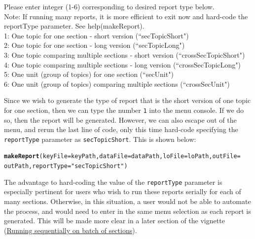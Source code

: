 \documentclass{article}\usepackage[]{graphicx}\usepackage[]{color}
\makeatletter
\newcommand{\hlstr}[1]{\textcolor[rgb]{0.192,0.494,0.8}{#1}}%
\newcommand{\hlstd}[1]{\textcolor[rgb]{0.345,0.345,0.345}{#1}}%
\newcommand{\hlkwc}[1]{\textcolor[rgb]{0.333,0.667,0.333}{#1}}%
\newcommand{\hlkwd}[1]{\textcolor[rgb]{0.737,0.353,0.396}{\textbf{#1}}}%
\newenvironment{kframe}{%
 \def\at@end@of@kframe{}%
 \ifinner\ifhmode%
  \def\at@end@of@kframe{\end{minipage}}%
  \begin{minipage}{\columnwidth}%
 \fi\fi%
 \def\FrameCommand##1{\hskip\@totalleftmargin \hskip-\fboxsep
 \colorbox{shadecolor}{##1}\hskip-\fboxsep
     \hskip-\linewidth \hskip-\@totalleftmargin \hskip\columnwidth}%
 \MakeFramed {\advance\hsize-\width
   \@totalleftmargin\z@ \linewidth\hsize
   \@setminipage}}%
 {\par\unskip\endMakeFramed%
 \at@end@of@kframe}
\newenvironment{knitrout}{}{} %
\numberwithin{equation}{section} %
\makeatother
\begin{document}
\begin{framed}
\vspace{2mm}
Please enter integer (1-6) corresponding to desired report type below.\\

Note: If running many reports, it is more efficient to exit now and hard-code the reportType parameter. See help(makeReport).\\

1: One topic for one section - short version (``secTopicShort")\\
2: One topic for one section - long version (``secTopicLong")\\
3: One topic comparing multiple sections - short version (``crossSecTopicShort")\\
4: One topic comparing multiple sections - long version (``crossSecTopicLong")\\
5: One unit (group of topics) for one section (``secUnit")\\
6: One unit (group of topics) comparing multiple sections (``crossSecUnit")\\
\end{framed}

Since we wish to generate the type of report that is the short version of one topic for one section, then we can type the number \texttt{1} into the menu console. If we do so, then the report will be generated. However, we can also escape out of the menu, and rerun the last line of code, only this time hard-code specifying the \texttt{reportType} parameter as \texttt{secTopicShort}. This is shown below:

\begin{knitrout}
\color{fgcolor}\begin{kframe}
\begin{alltt}
\hlkwd{makeReport}\hlstd{(}\hlkwc{keyFile} \hlstd{= keyPath,} \hlkwc{dataFile} \hlstd{= dataPath,} \hlkwc{loFile} \hlstd{= loPath,} \hlkwc{outFile} \hlstd{=}
  \hlstd{outPath,} \hlkwc{reportType} \hlstd{=} \hlstr{"secTopicShort"}\hlstd{)}
\end{alltt}
\end{kframe}
\end{knitrout}

The advantage to hard-coding the value of the \texttt{reportType} parameter is especially pertinent for users who wish to run these reports serially for each of many sections. Otherwise, in this situation, a user would not be able to automate the process, and would need to enter in the same menu selection as each report is generated. This will be made more clear in a later section of the vignette (\hyperref[sec:sequential]{Running sequentially on batch of sections}). \\
\end{document}
